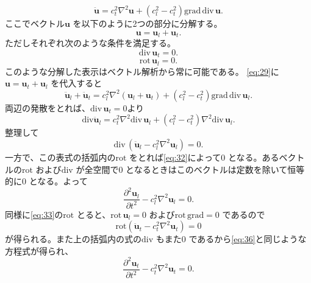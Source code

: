 \documentclass[dvipdfmx,11pt]{jsreport}
\numberwithin{equation}{chapter}
\numberwithin{table}{chapter}
\begin{document}
\begin{equation}
\label{eq:29}
	\ddot{\bm{u}}=c_t^2 \nabla ^2\bm{u}+(c_l^2-c_t^2)\mathrm{grad}\,\mathrm{div}\,\bm{u}
.\end{equation}
ここでベクトル$\bm{u}$ を以下のように2つの部分に分解する。
\begin{equation}
\label{eq:30}
	\bm{u}=\bm{u}_l+\bm{u}_t
.\end{equation}
ただしそれぞれ次のような条件を満足する。
\begin{equation}
\label{eq:31}
\mathrm{div}\,\bm{u}_t=0
.\end{equation}
\begin{equation}
\label{eq:32}
\mathrm{rot}\,\bm{u}_l=0
.\end{equation}
このような分解した表示はベクトル解析から常に可能である。
\eqref{eq:29}に$\bm{u}=\bm{u}_t+\bm{u}_l$ を代入すると
\begin{equation}
\label{eq:33}
	\ddot{\bm{u}}_l+\ddot{\bm{u}}_t=c_{l}^2 \nabla ^2(\bm{u}_l+\bm{u}_t)+(c_l^2-c_t^2)\mathrm{grad}\,\mathrm{div}\,\bm{u}_l
.\end{equation}
両辺の発散をとれば、$\mathrm{div}\,\bm{u}_t=0$より
\begin{equation}
\label{eq:34}
	\mathrm{div}\ddot{\bm{u}}_l=c_t^2\nabla ^2\mathrm{div}\,\bm{u}_l+(c_l^2-c_t^2)\nabla ^2 \mathrm{div}\,\bm{u}_l
.\end{equation}
整理して
\begin{equation}
\label{eq:35}
	\mathrm{div}\,(\ddot{\bm{u}}_l-c_l^2\nabla ^2\bm{u}_l)=0
.\end{equation}
一方で、この表式の括弧内の$\mathrm{rot}$ をとれば\eqref{eq:32}によって$0$ となる。あるベクトルの$\mathrm{rot}$ および$\mathrm{div}$ が全空間で$0$ となるときはこのベクトルは定数を除いて恒等的に$0$ となる。よって
\begin{equation}
\label{eq:36}
	\frac{\partial ^2\bm{u}_l}{\partial t^2} -c_l^2\nabla ^2\bm{u}_l=0
.\end{equation}
同様に\eqref{eq:33}の$\mathrm{rot}$ とると、$\mathrm{rot}\,\bm{u}_l=0$ および$\mathrm{rot}\,\mathrm{grad}=0$ であるので
\begin{equation}
\label{eq:37}
	\mathrm{rot}(\ddot{\bm{u}}_t-c_t^2\nabla ^2\bm{u}_t)=0
\end{equation}
が得られる。また上の括弧内の式の$\mathrm{div}$ もまた$0$ であるから\eqref{eq:36}と同じような方程式が得られ、
\begin{equation}
\label{eq:38}
	\frac{\partial ^2\bm{u}_t}{\partial t^2} -c_t^2\nabla ^2\bm{u}_t=0
.\end{equation}
\end{document}
